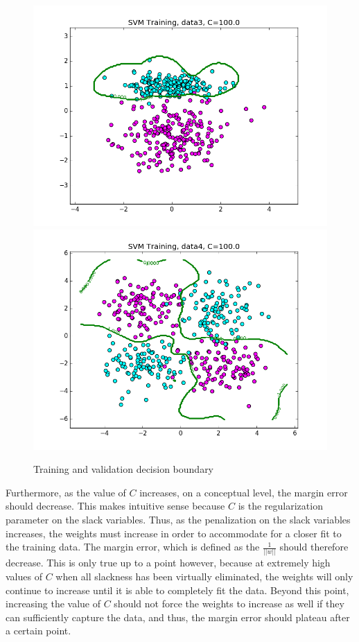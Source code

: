 \documentclass{article}
\begin{document}
\begin{figure}[width=\linewidth]
\begin{multicols}{2}
  \includegraphics[width=1.2\linewidth]{code/P2/rbf_training,C=100,data3.png}
  \includegraphics[width=1.2\linewidth]{code/P2/rbf_training,C=100,data4.png}
\end{multicols}
\caption{Training and validation decision boundary}
\end{figure}

Furthermore, as the value of $C$ increases, on a conceptual level, the margin error should decrease. This makes intuitive sense because $C$ is the regularization parameter on the slack variables. Thus, as the penalization on the slack variables increases, the weights must increase in order to accommodate for a closer fit to the training data. The margin error, which is defined as the $\frac{1}{||w||}$ should therefore decrease. This is only true up to a point however, because at extremely high values of $C$ when all slackness has been virtually eliminated, the weights will only continue to increase until it is able to completely fit the data. Beyond this point, increasing the value of $C$ should not force the weights to increase as well if they can sufficiently capture the data, and thus, the margin error should plateau after a certain point. \\
\end{document}

